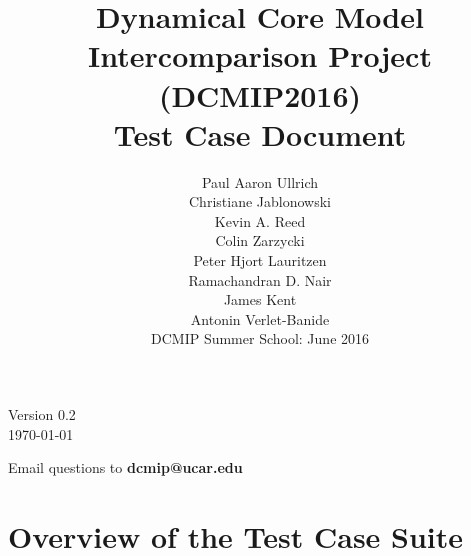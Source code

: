 \documentclass[times,doublespace]{fldauth}
\begin{document}
\setcounter{section}{-1}

\title{Dynamical Core Model Intercomparison Project (DCMIP2016) \\
 Test Case Document}
\author{Paul Aaron Ullrich \\ Christiane Jablonowski \\ Kevin A. Reed \\ Colin Zarzycki \\ Peter Hjort Lauritzen \\ Ramachandran D. Nair \\ James Kent \\Antonin Verlet-Banide \\ \vspace{3cm} DCMIP Summer School: June 2016}

\maketitle

\begin{center}
Version 0.2 \\
\today
\end{center}

\vspace{2cm}

\begin{center}
Email questions to \textbf{dcmip@ucar.edu}
\end{center}

\clearpage

\section*{Overview of the Test Case Suite}
\end{document}
